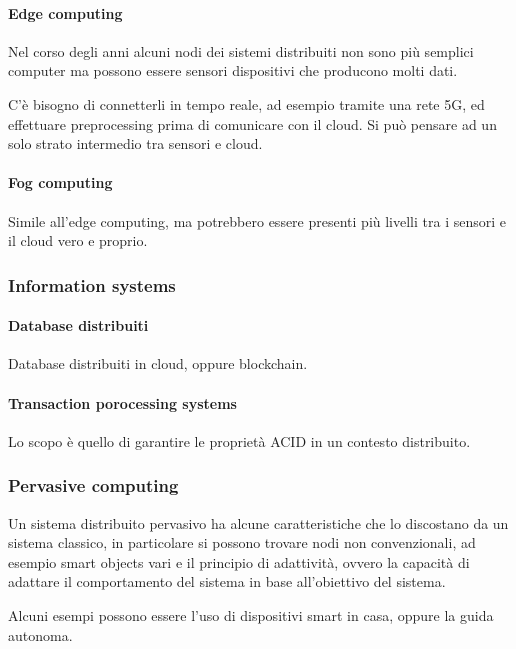 \paragraph{Edge computing}
Nel corso degli anni alcuni nodi dei sistemi distribuiti non sono più 
semplici computer ma possono essere sensori dispositivi che 
producono molti dati.

C'è bisogno di connetterli in tempo reale, ad esempio tramite una rete 5G, ed effettuare 
preprocessing prima di comunicare con il cloud.
Si può pensare ad un solo strato intermedio tra sensori e cloud.

\paragraph{Fog computing}
Simile all'edge computing, ma potrebbero essere presenti più livelli tra i sensori 
e il cloud vero e proprio.

\subsubsection{Information systems}

\paragraph{Database distribuiti}
Database distribuiti in cloud, oppure blockchain.

\paragraph{Transaction porocessing systems}
Lo scopo è quello di garantire le proprietà ACID in un contesto distribuito.

\subsubsection{Pervasive computing}

Un sistema distribuito pervasivo ha alcune caratteristiche che 
lo discostano da un sistema classico, in particolare si possono trovare 
nodi non convenzionali, ad esempio smart objects vari e il principio 
di adattività, ovvero la capacità di adattare il comportamento del sistema
in base all'obiettivo del sistema.

Alcuni esempi possono essere l'uso di dispositivi smart in casa, oppure 
la guida autonoma.

